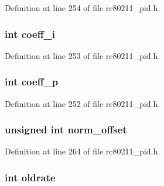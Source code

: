 Definition at line 254 of file rc80211\-\_\-pid.\-h.

\hypertarget{structrc__pid__info_aa7a1ae58ae054f4634ba919f4567af37}{
\subsubsection[{coeff\-\_\-i}]{\setlength{\rightskip}{0pt plus 5cm}int coeff\-\_\-i}}\label{structrc__pid__info_aa7a1ae58ae054f4634ba919f4567af37}


Definition at line 253 of file rc80211\-\_\-pid.\-h.

\hypertarget{structrc__pid__info_a249e72e36aa45ff6e09bce908d9491f0}{
\subsubsection[{coeff\-\_\-p}]{\setlength{\rightskip}{0pt plus 5cm}int coeff\-\_\-p}}\label{structrc__pid__info_a249e72e36aa45ff6e09bce908d9491f0}


Definition at line 252 of file rc80211\-\_\-pid.\-h.

\hypertarget{structrc__pid__info_a29160d78004070d0c75f2dba5f014ce9}{
\subsubsection[{norm\-\_\-offset}]{\setlength{\rightskip}{0pt plus 5cm}unsigned int norm\-\_\-offset}}\label{structrc__pid__info_a29160d78004070d0c75f2dba5f014ce9}


Definition at line 264 of file rc80211\-\_\-pid.\-h.

\hypertarget{structrc__pid__info_a7f0d2f9f4aa2b5b79fee366631f3558e}{
\subsubsection[{oldrate}]{\setlength{\rightskip}{0pt plus 5cm}int oldrate}}\label{structrc__pid__info_a7f0d2f9f4aa2b5b79fee366631f3558e}


